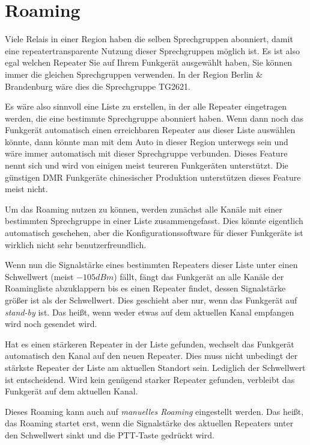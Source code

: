 \section{Roaming} \label{sec:roaming}
Viele Relais in einer Region haben die selben Sprechgruppen abonniert, damit eine repeatertransparente Nutzung dieser Sprechgruppen möglich ist. Es ist also egal welchen Repeater Sie auf Ihrem Funkgerät ausgewählt haben, Sie können immer die gleichen Sprechgruppen verwenden. In der Region Berlin \& Brandenburg wäre dies die Sprechgruppe TG2621. 

Es wäre also sinnvoll eine Liste zu erstellen, in der alle Repeater eingetragen werden, die eine bestimmte Sprechgruppe abonniert haben. Wenn dann noch das Funkgerät automatisch einen erreichbaren Repeater aus dieser Liste auswählen könnte, dann könnte man mit dem Auto in dieser Region unterwegs sein und wäre immer automatisch mit dieser Sprechgruppe verbunden. Dieses Feature nennt sich  und wird von einigen meist teureren Funkgeräten unterstützt. Die günstigen DMR Funkgeräte chinesischer Produktion unterstützen dieses Feature meist nicht. 

Um das Roaming nutzen zu können, werden zunächst alle Kanäle mit einer bestimmten Sprechgruppe in einer Liste zusammengefasst. Dies könnte eigentlich automatisch geschehen, aber die Konfigurationssoftware für dieser Funkgeräte ist wirklich nicht sehr benutzerfreundlich. 

Wenn nun die Signalstärke eines bestimmten Repeaters dieser Liste unter einen Schwellwert (meist $-105dBm$) fällt, fängt das Funkgerät an alle Kanäle der Roamingliste abzuklappern bis es einen Repeater findet, dessen Signalstärke größer ist als der Schwellwert. Dies geschieht aber nur, wenn das Funkgerät auf \emph{stand-by} ist. Das heißt, wenn weder etwas auf dem aktuellen Kanal empfangen wird noch gesendet wird. 

Hat es einen stärkeren Repeater in der Liste gefunden, wechselt das Funkgerät automatisch den Kanal auf den neuen Repeater. Dies muss nicht unbedingt der stärkste Repeater der Liste am aktuellen Standort sein. Lediglich der Schwellwert ist entscheidend. Wird kein genügend starker Repeater gefunden, verbleibt das Funkgerät auf dem aktuellen Kanal. 

Dieses Roaming kann auch auf \emph{manuelles Roaming} eingestellt werden. Das heißt, das Roaming startet erst, wenn die Signalstärke des aktuellen Repeaters unter den Schwellwert sinkt und die PTT-Taste gedrückt wird. 